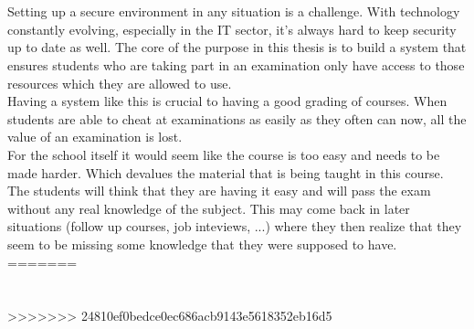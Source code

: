 \chapter*{}
Setting up a secure environment in any situation is a challenge. With technology constantly evolving, especially in the IT sector, it's always hard to keep security up to date as well. The core of  the purpose in this thesis is to build a system that ensures students who are taking part in an examination only have access to those resources which they are allowed to use. \\ Having a system like this is crucial to having a good grading of courses. When students are able to cheat at examinations as easily as they often can now, all the value of an examination is lost.\\ For the school itself it would seem like the course is too easy and needs to be made harder. Which devalues the material that is being taught in this course.  \\
The students will think that they are having it easy and will pass the exam without any real knowledge of the subject. This may come back in later situations (follow up courses, job inteviews, ...) where they then realize that they seem to be missing some knowledge that they were supposed to have.\\
=======
\chapter*{}

>>>>>>> 24810ef0bedce0ec686acb9143e5618352eb16d5

